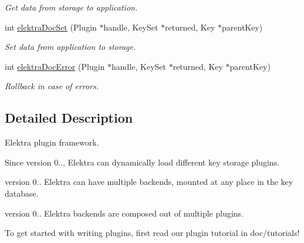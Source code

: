 \begin{DoxyCompactItemize}
\begin{DoxyCompactList}\small\item\em Get data from storage to application. \end{DoxyCompactList}\item 
int \hyperlink{group__plugin_gae65781a1deb34efc79c8cb9d9174842c}{elektra\-Doc\-Set} (Plugin $\ast$handle, Key\-Set $\ast$returned, Key $\ast$parent\-Key)
\begin{DoxyCompactList}\small\item\em Set data from application to storage. \end{DoxyCompactList}\item 
int \hyperlink{group__plugin_gad74b35f558ac7c3262f6069c5c47dc79}{elektra\-Doc\-Error} (Plugin $\ast$handle, Key\-Set $\ast$returned, Key $\ast$parent\-Key)
\begin{DoxyCompactList}\small\item\em Rollback in case of errors. \end{DoxyCompactList}\end{DoxyCompactItemize}


\subsection{Detailed Description}
Elektra plugin framework. \begin{DoxySince}{Since}
version 0.., Elektra can dynamically load different key storage plugins.

version 0.. Elektra can have multiple backends, mounted at any place in the key database.

version 0.. Elektra backends are composed out of multiple plugins.
\end{DoxySince}
To get started with writing plugins, first read our plugin tutorial in doc/tutorials!

